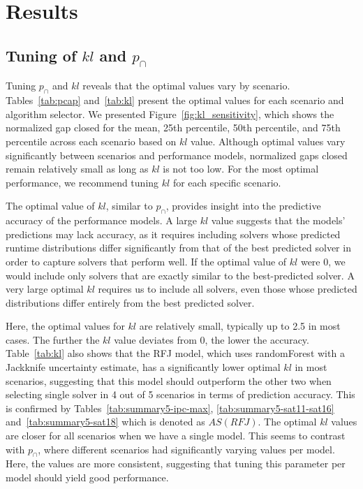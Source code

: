 \section{Results}
\subsection{Tuning of $kl$ and $p_{\cap}$}

Tuning $p_{\cap}$ and $kl$ reveals that the optimal values vary by scenario. Tables~\ref{tab:pcap} and~\ref{tab:kl} present the optimal values for each scenario and algorithm selector. We presented Figure~\ref{fig:kl_sensitivity}, which shows the normalized gap closed for the mean, 25th percentile, 50th percentile, and 75th percentile across each scenario based on $kl$ value. Although optimal values vary significantly between scenarios and performance models, normalized gaps closed remain relatively small as long as $kl$ is not too low. For the most optimal performance, we recommend tuning $kl$ for each specific scenario.

The optimal value of $kl$, similar to $p_{\cap}$, provides insight into the predictive accuracy of the performance models. A large $kl$ value suggests that the models' predictions may lack accuracy, as it requires including solvers whose predicted runtime distributions differ significantly from that of the best predicted solver in order to capture solvers that perform well. If the optimal value of $kl$ were 0, we would include only solvers that are exactly similar to the best-predicted solver. A very large optimal $kl$ requires us to include all solvers, even those whose predicted distributions differ entirely from the best predicted solver. 

Here, the optimal values for $kl$ are relatively small, typically up to 2.5 in most cases. The further the $kl$ value deviates from 0, the lower the accuracy. Table~\ref{tab:kl} also shows that the RFJ model, which uses randomForest with a Jackknife uncertainty estimate, has a significantly lower optimal $kl$ in most scenarios, suggesting that this model should outperform the other two when selecting single solver in 4 out of 5 scenarios in terms of prediction accuracy. This is confirmed by Tables~\ref{tab:summary5-ipc-max}, \ref{tab:summary5-sat11-sat16} and~\ref{tab:summary5-sat18} which is denoted as $AS (RFJ)$. The optimal $kl$ values are closer for all scenarios when we have a single model. This seems to contrast with $p_{\cap}$, where different scenarios had significantly varying values per model. Here, the values are more consistent, suggesting that tuning this parameter per model should yield good performance.

